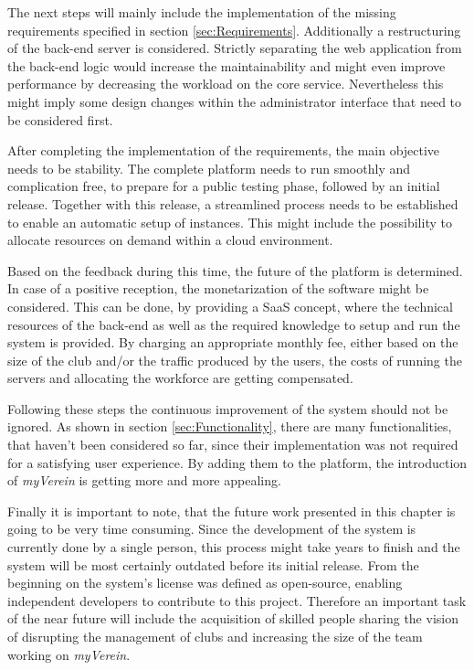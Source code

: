 The next steps will mainly include the implementation of the missing requirements specified in section \vref{sec:Requirements}. Additionally a restructuring of the back-end server is considered. Strictly separating the web application from the back-end logic would increase the maintainability and might even improve performance by decreasing the workload on the core service. Nevertheless this might imply some design changes within the administrator interface that need to be considered first.

After completing the implementation of the requirements, the main objective needs to be stability. The complete platform needs to run smoothly and complication free, to prepare for a public testing phase, followed by an initial release. Together with this release, a streamlined process needs to be established to enable an automatic setup of instances. This might include the possibility to allocate resources on demand within a cloud environment.

Based on the feedback during this time, the future of the platform is determined. In case of a positive reception, the monetarization of the software might be considered. This can be done, by providing a \gls{SaaS} concept, where the technical resources of the back-end as well as the required knowledge to setup and run the system is provided. By charging an appropriate monthly fee, either based on the size of the club and/or the traffic produced by the users, the costs of running the servers and allocating the workforce are getting compensated.

Following these steps the continuous improvement of the system should not be ignored. As shown in section \vref{sec:Functionality}, there are many functionalities, that haven't been considered so far, since their implementation was not required for a satisfying user experience. By adding them to the platform, the introduction of \emph{myVerein} is getting more and more appealing.

Finally it is important to note, that the future work presented in this chapter is going to be very time consuming. Since the development of the system is currently done by a single person, this process might take years to finish and the system will be most certainly outdated before its initial release. From the beginning on the system's license was defined as open-source, enabling independent developers to contribute to this project. Therefore an important task of the near future will include the acquisition of skilled people sharing the vision of disrupting the management of clubs and increasing the size of the team working on \emph{myVerein}.





